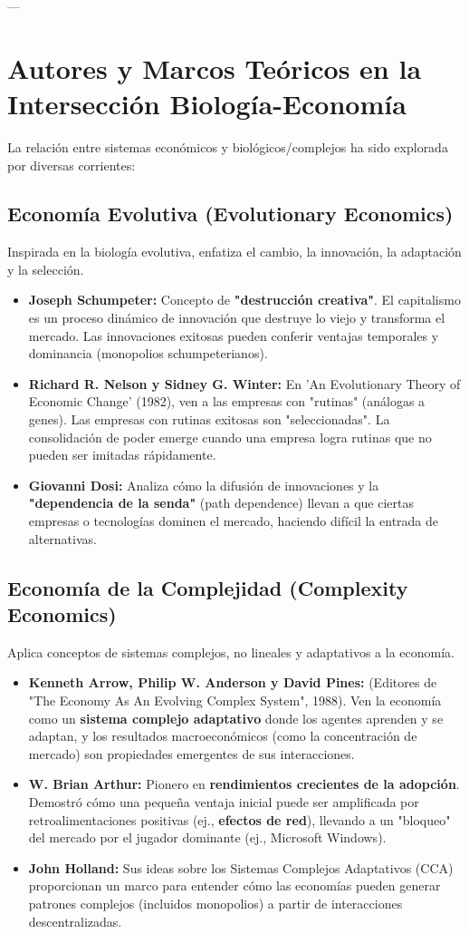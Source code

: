 \documentclass{article}
\begin{document}
---

\section{Autores y Marcos Teóricos en la Intersección Biología-Economía}

La relación entre sistemas económicos y biológicos/complejos ha sido explorada por diversas corrientes:

\subsection{Economía Evolutiva (Evolutionary Economics)}
Inspirada en la biología evolutiva, enfatiza el cambio, la innovación, la adaptación y la selección.
\begin{itemize}
    \item \textbf{Joseph Schumpeter:} Concepto de \textbf{"destrucción creativa"}. El capitalismo es un proceso dinámico de innovación que destruye lo viejo y transforma el mercado. Las innovaciones exitosas pueden conferir ventajas temporales y dominancia (monopolios schumpeterianos).
    \item \textbf{Richard R. Nelson y Sidney G. Winter:} En 'An Evolutionary Theory of Economic Change' (1982), ven a las empresas con "rutinas" (análogas a genes). Las empresas con rutinas exitosas son "seleccionadas". La consolidación de poder emerge cuando una empresa logra rutinas que no pueden ser imitadas rápidamente.
    \item \textbf{Giovanni Dosi:} Analiza cómo la difusión de innovaciones y la \textbf{"dependencia de la senda"} (path dependence) llevan a que ciertas empresas o tecnologías dominen el mercado, haciendo difícil la entrada de alternativas.
\end{itemize}

\subsection{Economía de la Complejidad (Complexity Economics)}
Aplica conceptos de sistemas complejos, no lineales y adaptativos a la economía.
\begin{itemize}
    \item \textbf{Kenneth Arrow, Philip W. Anderson y David Pines:} (Editores de "The Economy As An Evolving Complex System", 1988). Ven la economía como un \textbf{sistema complejo adaptativo} donde los agentes aprenden y se adaptan, y los resultados macroeconómicos (como la concentración de mercado) son propiedades emergentes de sus interacciones.
    \item \textbf{W. Brian Arthur:} Pionero en \textbf{rendimientos crecientes de la adopción}. Demostró cómo una pequeña ventaja inicial puede ser amplificada por retroalimentaciones positivas (ej., \textbf{efectos de red}), llevando a un "bloqueo" del mercado por el jugador dominante (ej., Microsoft Windows).
    \item \textbf{John Holland:} Sus ideas sobre los Sistemas Complejos Adaptativos (CCA) proporcionan un marco para entender cómo las economías pueden generar patrones complejos (incluidos monopolios) a partir de interacciones descentralizadas.
\end{itemize}
\end{document}
